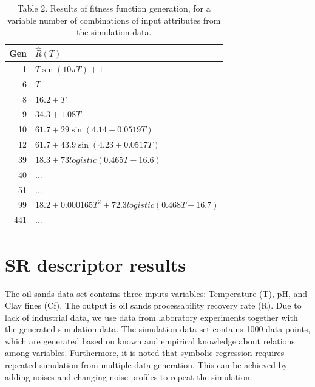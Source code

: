 \documentclass[10pt,journal,compsoc]{IEEEtran}
\begin{document}
\begin{table}[hptb]\label{tab:iteration}
		\begin{center}
			\captionsetup{labelformat=empty}
			
			\caption{Table 2. Results of fitness function generation, for a variable number of combinations of input attributes from the simulation data.}
			
			\begin{tabular}{|r|l|}
				\hline
				Gen & $\hat{R}(T)$ \\
				\hline
				1 & $T \sin ( 10 \pi T ) + 1$ \\
				6 & $T$ \\
				8 & $16.2+T$ \\
				9 & $34.3+1.08T$ \\
				10 & $61.7+29\sin(4.14+0.0519T)$ \\
				12 & $61.7+43.9\sin(4.23+0.0517T)$ \\
				39 & $18.3+73logistic(0.465T-16.6)$ \\
				40 & ... \\
				51 & ... \\
				99 & $18.2+0.000165T^2 +72.3logistic(0.468T-16.7)$ \\
				441 & ... \\
				\hline
			\end{tabular}

		\end{center}
\end{table}

\section{SR descriptor results} \label{sec:related}

The oil sands data set contains three inputs variables: Temperature (T), pH, and Clay fines (Cf). The output is oil sands processability recovery rate (R). Due to lack of industrial data, we use data from laboratory experiments together with the generated simulation data. The simulation data set contains 1000 data points, which are generated based on known and empirical knowledge about relations among variables. Furthermore, it is noted that symbolic regression requires repeated simulation from multiple data generation. This can be achieved by adding noises and changing noise profiles to repeat the simulation.
\end{document}

